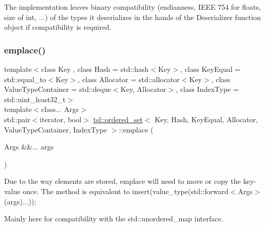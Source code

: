 The implementation leaves binary compatibility (endianness, I\+E\+EE 754 for floats, size of int, ...) of the types it deserializes in the hands of the {\ttfamily Deserializer} function object if compatibility is required. \mbox{\label{classtsl_1_1ordered__set_ad4a8ee2e57f3c30fe19b326a874f0bd5}} 
\subsubsection{\texorpdfstring{emplace()}{emplace()}}
{\footnotesize\ttfamily template$<$class Key , class Hash  = std\+::hash$<$\+Key$>$, class Key\+Equal  = std\+::equal\+\_\+to$<$\+Key$>$, class Allocator  = std\+::allocator$<$\+Key$>$, class Value\+Type\+Container  = std\+::deque$<$\+Key, Allocator$>$, class Index\+Type  = std\+::uint\+\_\+least32\+\_\+t$>$ \\
template$<$class... Args$>$ \\
std\+::pair$<$iterator, bool$>$ \mbox{\hyperlink{classtsl_1_1ordered__set}{tsl\+::ordered\+\_\+set}}$<$ Key, Hash, Key\+Equal, Allocator, Value\+Type\+Container, Index\+Type $>$\+::emplace (\begin{DoxyParamCaption}\item[{Args \&\&...}]{args }\end{DoxyParamCaption})\hspace{0.3cm}{\ttfamily [inline]}}

Due to the way elements are stored, emplace will need to move or copy the key-\/value once. The method is equivalent to insert(value\+\_\+type(std\+::forward$<$\+Args$>$(args)...));

Mainly here for compatibility with the std\+::unordered\+\_\+map interface. \mbox{\label{classtsl_1_1ordered__set_a227c222d9754fccd991600f109b86aea}} 

